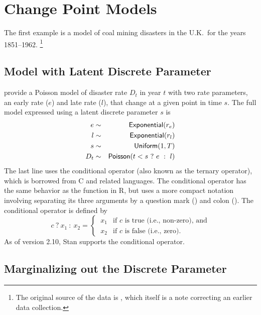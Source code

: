 \section{Change Point Models}

The first example is a model of coal mining disasters in the U.K.\
for the years 1851--1962.%
%
\footnote{The original source of the data is \citep{Jarret:1979},
  which itself is a note correcting an earlier data collection.}
%

\subsection{Model with Latent Discrete Parameter}

\citep[Section 3.1]{PyMC:2014} provide a Poisson model of disaster
rate $D_t$ in year $t$ with two rate parameters, an early rate ($e$)
and late rate ($l$), that change at a given point in time $s$.  The
full model expressed using a latent discrete parameter $s$ is
%
\begin{eqnarray*}
e & \sim & \distro{Exponential}(r_e)
\\
l & \sim & \distro{Exponential}(r_l)
\\
s & \sim & \distro{Uniform}(1, T)
\\
D_t & \sim & \distro{Poisson}(t < s \ ? \ e \ : \ l)
\end{eqnarray*}
%
The last line uses the conditional operator (also known as the ternary
operator), which is borrowed from C and related languages.  The
conditional operator has the same behavior as the 
function in R, but uses a more compact notation involving separating
its three arguments by a question mark (\code{?})  and colon
(\code{:}).  The conditional operator is defined by
%
\[
c \ ? \ x_1 \ : \ x_2
=
\begin{cases}
\ x_1 & \mbox{if } c \mbox{ is true (i.e., non-zero), and}
\\
\ x_2 & \mbox{if } c \mbox{ is false (i.e., zero).}
\end{cases}
\]
As of version 2.10, Stan supports the conditional operator.


\subsection{Marginalizing out the Discrete Parameter}

